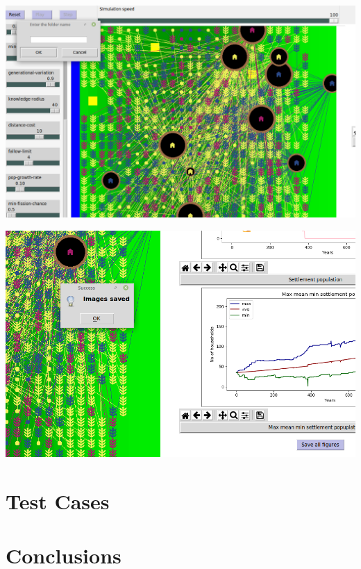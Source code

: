 \documentclass[12pt]{article}
\begin{document}
		\includegraphics[width=\linewidth]{SaveAll1}
		
		\includegraphics[width=\linewidth]{SaveAll2}
	\section{Test Cases}

	\section{Conclusions}
	
	\begin{thebibliography}{9}

	\end{thebibliography}
\end{document}
